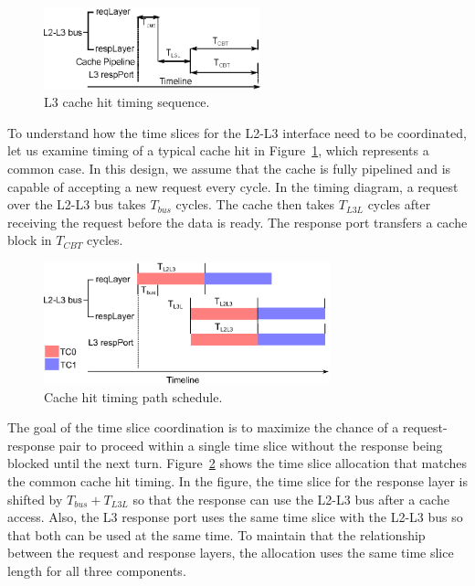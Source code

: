 \begin{figure}
    \begin{center}
        \includegraphics[width=2.4675in]{figs/hit_timing.eps}
        \caption{L3 cache hit timing sequence.}
        \label{fig:hit_timing}
    \end{center}
\end{figure}

To understand how the time slices for the L2-L3 interface need to be coordinated,
let us examine timing of a typical cache hit in Figure~\ref{fig:hit_timing},
which represents a common case. In this design, we assume that the cache is fully
pipelined and is capable of accepting a new request every cycle.
In the timing diagram, a request over the 
L2-L3 bus takes $T_{bus}$ cycles. The cache then takes $T_{L3L}$ cycles after 
receiving the request before the data is ready.
The response port transfers a cache block in $T_{CBT}$ cycles. 

\begin{figure}
    \begin{center}
        \includegraphics[width=3.2624in]{figs/hit_schedule.eps}
        \caption{Cache hit timing path schedule.}
        \label{fig:hit_schedule}
    \end{center}
\end{figure}

The goal of the time slice coordination is to maximize the chance of a 
request-response pair to proceed within a single time slice without the
response being blocked until the next turn.
Figure~\ref{fig:hit_schedule} shows the time slice allocation that matches 
the common cache hit timing. 
In the figure, the time slice for the response layer is shifted by $T_{bus} + T_{L3L}$
so that the response can use the L2-L3 bus after a cache access.
Also, the L3 response port uses the same time slice with the L2-L3 bus so that
both can be used at the same time.
To maintain that the relationship between the request and response layers,
the allocation uses the same time slice length for all three components.

